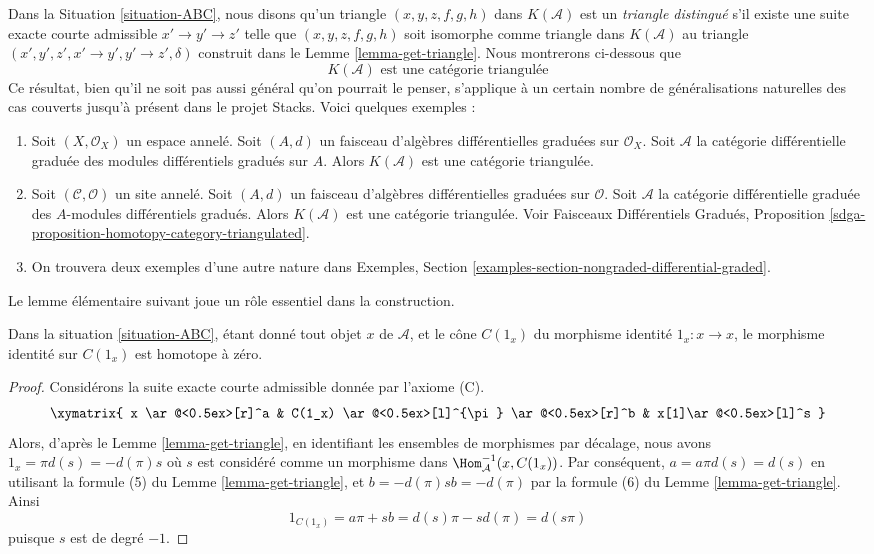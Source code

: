 \noindent
Dans la Situation \ref{situation-ABC}, nous disons qu'un triangle $(x, y, z, f, g,
h)$ dans $K(\mathcal{A})$ est un {\it triangle distingué} s'il existe une suite
exacte courte admissible $x' \to y' \to z'$ telle que $(x, y, z, f, g, h)$ soit
isomorphe comme triangle dans $K(\mathcal{A})$ au triangle $(x', y', z', x' \to
y', y' \to z', \delta)$ construit dans le Lemme \ref{lemma-get-triangle}. Nous
montrerons ci-dessous que
$$
\boxed{
K(\mathcal{A})\text{ est une catégorie triangulée}
}
$$
Ce résultat, bien qu'il ne soit pas aussi général qu'on pourrait le penser, s'applique à un
certain nombre de généralisations naturelles des cas couverts jusqu'à présent dans
le projet Stacks. Voici quelques exemples :
\begin{enumerate}
\item Soit $(X, \mathcal{O}_X)$ un espace annelé. Soit $(A, d)$ un faisceau
d'algèbres différentielles graduées sur $\mathcal{O}_X$. Soit $\mathcal{A}$ la
catégorie différentielle graduée des modules différentiels gradués sur $A$.
Alors $K(\mathcal{A})$ est une catégorie triangulée.
\item Soit $(\mathcal{C}, \mathcal{O})$ un site annelé. Soit $(A, d)$ un faisceau
d'algèbres différentielles graduées sur $\mathcal{O}$. Soit $\mathcal{A}$ la catégorie
différentielle graduée des $A$-modules différentiels gradués. Alors
$K(\mathcal{A})$ est une catégorie triangulée. Voir Faisceaux Différentiels
Gradués, Proposition \ref{sdga-proposition-homotopy-category-triangulated}.
\item On trouvera deux exemples d'une autre nature dans
Exemples, Section \ref{examples-section-nongraded-differential-graded}.
\end{enumerate}

\noindent
Le lemme élémentaire suivant joue un rôle essentiel dans la construction.

\begin{lemma}
\label{lemma-id-cone-null}
Dans la situation \ref{situation-ABC}, étant donné tout objet $x$ de
$\mathcal{A}$, et le cône $C(1_x)$ du morphisme identité $1_x : x \to x$, le
morphisme identité sur $C(1_x)$ est homotope à zéro.
\end{lemma}

\begin{proof}
Considérons la suite exacte courte admissible donnée par l'axiome (C).
$$
\xymatrix{
x \ar@<0.5ex>[r]^a  &
C(1_x) \ar@<0.5ex>[l]^{\pi} \ar@<0.5ex>[r]^b &
x[1]\ar@<0.5ex>[l]^s
}
$$
Alors, d'après le Lemme \ref{lemma-get-triangle}, en identifiant les ensembles de morphismes
par décalage, nous avons $1_x=\pi d(s)=-d(\pi)s$ où $s$ est considéré comme un
morphisme dans $\Hom_{\mathcal{A}}^{-1}(x,C(1_x))$. Par conséquent, $a=a\pi
d(s)=d(s)$ en utilisant la formule (5) du Lemme \ref{lemma-get-triangle}, et
$b=-d(\pi)sb=-d(\pi)$ par la formule (6) du Lemme \ref{lemma-get-triangle}. Ainsi
$$
1_{C(1_x)} = a\pi + sb = d(s)\pi - sd(\pi) = d(s\pi)
$$
puisque $s$ est de degré $-1$.
\end{proof}

